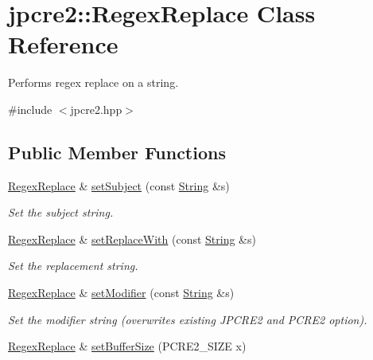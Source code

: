 \hypertarget{classjpcre2_1_1RegexReplace}{}\section{jpcre2\+:\+:Regex\+Replace Class Reference}
\label{classjpcre2_1_1RegexReplace}


Performs regex replace on a string.  




{\ttfamily \#include $<$jpcre2.\+hpp$>$}

\subsection*{Public Member Functions}
\begin{DoxyCompactItemize}
\item 
\hyperlink{classjpcre2_1_1RegexReplace}{Regex\+Replace} \& \hyperlink{classjpcre2_1_1RegexReplace_a46eefdb105827920bebc8436721fa4cb}{set\+Subject} (const \hyperlink{namespacejpcre2_a91f03070152fb228bc116c5a737f1d16}{String} \&s)
\begin{DoxyCompactList}\small\item\em Set the subject string. \end{DoxyCompactList}\item 
\hyperlink{classjpcre2_1_1RegexReplace}{Regex\+Replace} \& \hyperlink{classjpcre2_1_1RegexReplace_af1069f489de9b343493da2dc77b04c73}{set\+Replace\+With} (const \hyperlink{namespacejpcre2_a91f03070152fb228bc116c5a737f1d16}{String} \&s)
\begin{DoxyCompactList}\small\item\em Set the replacement string. \end{DoxyCompactList}\item 
\hyperlink{classjpcre2_1_1RegexReplace}{Regex\+Replace} \& \hyperlink{classjpcre2_1_1RegexReplace_ae2abe2994b0fbe54950f88e63000c910}{set\+Modifier} (const \hyperlink{namespacejpcre2_a91f03070152fb228bc116c5a737f1d16}{String} \&s)
\begin{DoxyCompactList}\small\item\em Set the modifier string (overwrites existing J\+P\+C\+R\+E2 and P\+C\+R\+E2 option). \end{DoxyCompactList}\item 
\hyperlink{classjpcre2_1_1RegexReplace}{Regex\+Replace} \& \hyperlink{classjpcre2_1_1RegexReplace_a452dd2632031a13b39c13b792f18a491}{set\+Buffer\+Size} (P\+C\+R\+E2\+\_\+\+S\+I\+ZE x)

\end{DoxyCompactItemize}
